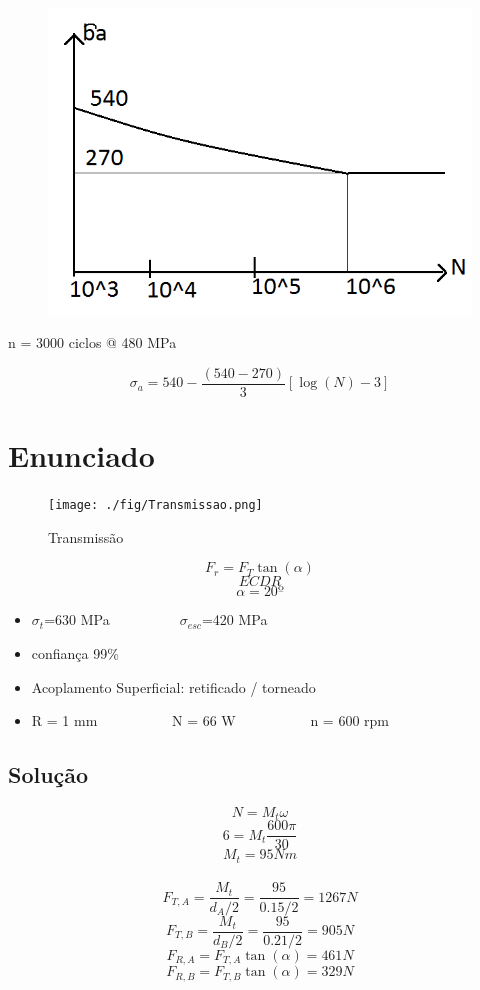 \documentclass[a4paper, 12pt]{article}
\begin{document}
\begin{figure}[h]
\begin{center}
\includegraphics[scale=0.55]{./fig/10.png}
\caption{\label{fig:10}} 
\end{center}
\end{figure}

n = 3000 ciclos @ 480 MPa

\[\sigma _{a}=540-\frac{(540-270)}{3}\left[ \log(N)-3 \right]\]

\newpage

\section{Enunciado}

\begin{figure}[h]
\begin{center}
\texttt{[image: ./fig/Transmissao.png]}
\caption{\label{fig:11}Transmissão} 
\end{center}
\end{figure}

\[F_{r}=F_{T}\tan(\alpha)\]
\[ECDR\]
\[\alpha = 20º\]
\begin{itemize}
\item $\sigma _{t}$=630 MPa\ \ \ \ \ \ \ \ \ \ $\sigma _{esc}$=420 MPa
\item confiança 99\%
\item Acoplamento Superficial: retificado / torneado
\item R = 1 mm \ \ \ \ \ \ \ \ \ \ N = 66 W \ \ \ \ \ \ \ \ \ \ n = 600 rpm
\end{itemize}

\subsection*{Solução}
\[N = M_{t}\omega\]
\[6 = M_{t}\frac{600 \pi}{30}\]
\[M_{t}=95 Nm\]
\\
\[F_{T,A}=\frac{M_{t}}{d_{A}/2}=\frac{95}{0.15/2}=1267 N\]
\[F_{T,B}=\frac{M_{t}}{d_{B}/2}=\frac{95}{0.21/2}=905 N\]
\[F_{R,A}=F_{T,A}\tan(\alpha)=461 N\]
\[F_{R,B}=F_{T,B}\tan(\alpha)=329 N\]
\end{document}
